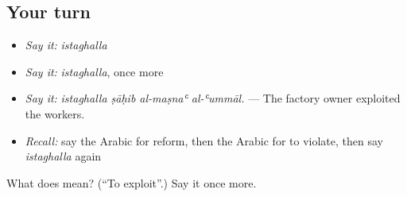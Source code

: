 \subsection*{Your turn}
\begin{itemize}
\raggedright
  \item \emph{Say it:} \emph{istaghalla}
  \item \emph{Say it:} \emph{istaghalla}, once more
  \item \emph{Say it:} \emph{istaghalla ṣāḥib al-maṣnaʿ al-ʿummāl.} — The factory owner exploited the workers.
  \item \emph{Recall:} say the Arabic for reform, then the Arabic for to violate, then say \emph{istaghalla} again
\end{itemize}

\begin{tcolorbox}[breakable,colback=teal!4,colframe=teal!35!black,title={Before you move on}]
What does  mean? (\textquotedblleft{}To exploit\textquotedblright{}.) Say it once more.
\end{tcolorbox}
